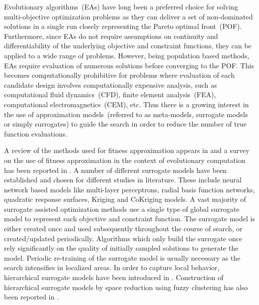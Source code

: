 Evolutionary algorithms~(EAs) have long been a preferred choice for solving multi-objective optimization problems as they can deliver a set of non-dominated solutions in a single run closely representing the Pareto optimal front~(POF).  Furthermore, since EAs do not require assumptions on continuity and differentiability of the underlying objective and constraint functions, they can be applied to a wide range of problems. However, being population based methods, EAs require evaluation of numerous solutions before converging to the POF. This becomes computationally prohibitive for problems where evaluation of each candidate design involves computationally expensive analysis, such as computational fluid dynamics~(CFD), finite element analysis~(FEA), computational electromagnetics~(CEM), etc. Thus there is a growing interest in the use of approximation models~(referred to as meta-models, surrogate models or simply surrogates) to guide the search in order to reduce the number of true function evaluations.

A review of the methods used for fitness approximation appears in \cite{wang_review_2007} and a survey on the use of fitness approximation in the context of evolutionary computation has been reported in \cite{jin2005csf}. A number of different surrogate models have been established and chosen for different studies in literature. These include neural network based models like multi-layer perceptrons, radial basis function networks, quadratic response surfaces, Kriging and CoKriging models. A vast majority of surrogate assisted optimization methods use a single type of global surrogate model to represent each objective and constraint function. The surrogate model is either created once and used subsequently throughout the course of search, or created/updated periodically. Algorithms which only build the surrogate once~\cite{wilson2001epf,goel_ensemble_2007} rely significantly on the quality of initially sampled solutions to generate the model. Periodic re-training of the surrogate model is usually necessary as the search intensifies in localized areas. In order to capture local behavior, hierarchical surrogate models have been introduced in \cite{zhou_combining_2007}. Construction of hierarchical surrogate models by space reduction using fuzzy clustering has also been reported in \cite{wang_fuzzy_2004}.

